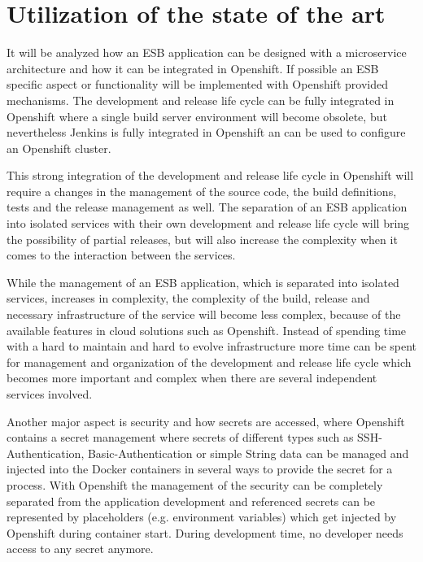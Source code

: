 \section{Utilization of the state of the art}
\label{sec:deduction}
It will be analyzed how an ESB application can be designed with a microservice architecture and how it can be integrated in Openshift. If possible an ESB specific aspect or functionality will be implemented with Openshift provided mechanisms. The development and release life cycle can be fully integrated in Openshift where a single build server environment will become obsolete, but nevertheless Jenkins is fully integrated in Openshift an can be used to configure an Openshift cluster.

This strong integration of the development and release life cycle in Openshift will require a changes in the management of the source code, the build definitions, tests and the release management as well. The separation of an ESB application into isolated services with their own development and release life cycle will bring the possibility of partial releases, but will also increase the complexity when it comes to the interaction between the services.

While the management of an ESB application, which is separated into isolated services, increases in complexity, the complexity of the build, release and necessary infrastructure  of the service will become less complex, because of the available features in cloud solutions such as Openshift. Instead of spending time with a hard to maintain and hard to evolve infrastructure more time can be spent for management and organization of the development and release life cycle which becomes more important and complex when there are several independent services involved.

Another major aspect is security and how secrets are accessed, where Openshift contains a secret management where secrets of different types such as SSH-Authentication, Basic-Authentication or simple String data can be managed and injected into the Docker containers in several ways to provide the secret for a process. With Openshift the management of the security can be completely separated from the application development and referenced secrets can be represented by placeholders (e.g. environment variables) which get injected by Openshift during container start. During development time, no developer needs access to any secret anymore.